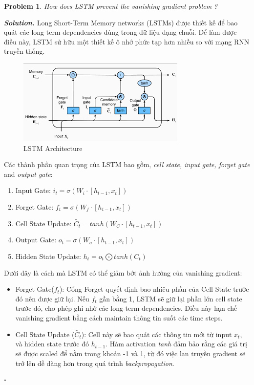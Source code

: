 \documentclass[12pt]{article}
\newtheorem{problem}{Problem}
\newenvironment{solution}[1][\it{Solution}]{\textbf{#1. } }{$\square$}
\begin{document}
\begin{problem}
	How does LSTM prevent the vanishing gradient problem ?
\end{problem}
\begin{solution}
	Long Short-Term Memory networks (LSTMs) được thiết kế để bao quát các long-term dependencies dùng trong dữ liệu dạng chuỗi. Để làm được điều này, LSTM sử hữu một thiết kế ô nhớ phức tạp hơn nhiều so với mạng RNN truyền thống. \\
	\begin{figure}[H]
		\centering
		\includegraphics[scale=0.8]{Images/LSTM_Architecture.png}
		\caption{LSTM Architecture}
	\end{figure}
	Các thành phần quan trọng của LSTM bao gồm, \textit{cell state, input gate, forget gate} and \textit{output gate}:
	\begin{enumerate}
		\item Input Gate: $i_t = \sigma(W_i \cdot [h_{t-1}, x_t])$
		\item Forget Gate: $f_t = \sigma(W_f \cdot [h_{t-1}, x_t])$
		\item Cell State Update: $\tilde{C_t} = tanh(W_C \cdot [h_{t-1}, x_t])$
		\item Output Gate: $o_t = \sigma(W_o \cdot [h_{t-1}, x_t])$
		\item Hidden State Update: $h_t = o_t \bigodot tanh(C_t)$
	\end{enumerate}
	
	Dưới đây là cách mà LSTM có thể giảm bớt ảnh hưởng của vanishing gradient:
	\begin{itemize}
		\item Forget Gate($f_t$):
		Cổng Forget quyết định bao nhiêu phần của Cell State trước đó nên được giữ lại. Nếu $f_t$ gần bằng 1, LSTM sẽ giữ lại phần lớn cell state trước đó, cho phép ghi nhớ các long-term dependencies. Điều này hạn chế vanishing gradient bằng cách maintain thông tin suốt các time steps.
		\item Cell State Update ($\tilde{C_t}$):
		Cell này sẽ bao quát các thông tin mới từ input $x_t$, và hidden state trước đó $h_{t-1}$. Hàm activation \textit{tanh} đảm bảo rằng các giá trị sẽ được scaled để nằm trong khoản -1 và 1, từ đó việc lan truyền gradient sẽ trở lên dễ dàng hơn trong quá trình \textit{backpropagation}.
	\end{itemize}
\end{solution}
\end{document}
